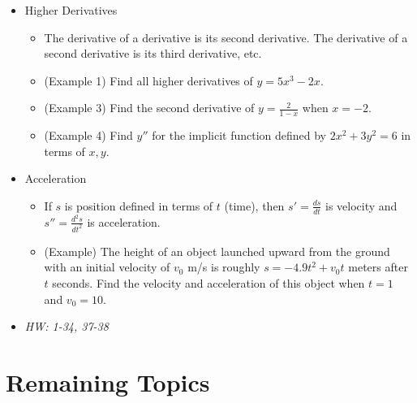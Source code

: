 \documentclass[11pt]{article}
\begin{document}
\begin{itemize}
\item Higher Derivatives
  \begin{itemize}
    \item The derivative of a derivative is its second derivative. The
          derivative of a second derivative is its third derivative, etc.
    \item (Example 1) Find all higher derivatives of \(y=5x^3-2x\).
    \item (Example 3) Find the second derivative of \(y=\frac{2}{1-x}\) when
          \(x=-2\).
    \item (Example 4) Find \(y''\) for the implicit function defined by
          \(2x^2+3y^2=6\) in terms of \(x,y\).
  \end{itemize}
\item Acceleration
  \begin{itemize}
    \item If \(s\) is position defined in terms of \(t\) (time), then
          \(s'=\frac{ds}{dt}\) is velocity and \(s''=\frac{d^2s}{dt^2}\)
          is acceleration.
    \item (Example) The height of an object launched upward from the ground
          with an initial velocity of \(v_0\) m/s is roughly
          \(s=-4.9t^2+v_0t\) meters after \(t\) seconds.
          Find the velocity and acceleration of this object when \(t=1\) and
          \(v_0=10\).
  \end{itemize}
\item\textit{
  HW: 1-34, 37-38
}
\end{itemize}



\section*{Remaining Topics}
\end{document}
